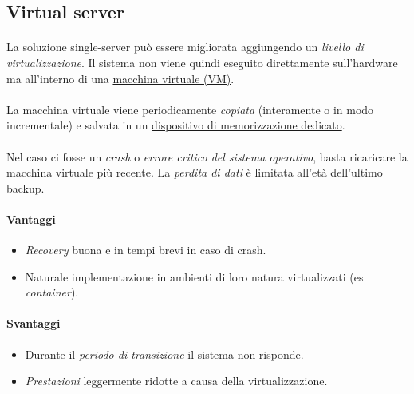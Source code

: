 \documentclass[11pt,a4paper,english]{article}
\begin{document}
\subsection{Virtual server}

\paragraph{} La soluzione single-server può essere migliorata aggiungendo un \emph{livello di virtualizzazione}. Il sistema non viene quindi eseguito direttamente sull'hardware ma all'interno di una \underline{macchina virtuale (VM)}\cite{vm}. 

\paragraph{} La macchina virtuale viene periodicamente \emph{copiata} (interamente o in modo incrementale\cite{backuptypes}) e salvata in un \underline{dispositivo di memorizzazione dedicato}. 

\paragraph{} Nel caso ci fosse un \emph{crash} o \emph{errore critico del sistema operativo}, basta ricaricare la macchina virtuale più recente. La \emph{perdita di dati} è limitata all'età dell'ultimo backup. 

\paragraph{Vantaggi} \begin{itemize}
	\item \emph{Recovery} buona e in tempi brevi in caso di crash.
	\item Naturale implementazione in ambienti di loro natura virtualizzati (es \emph{container}).
\end{itemize}


\paragraph{Svantaggi} \begin{itemize}
	\item Durante il \emph{periodo di transizione} il sistema non risponde.
	\item \emph{Prestazioni} leggermente ridotte a causa della virtualizzazione.
\end{itemize}
\end{document}
